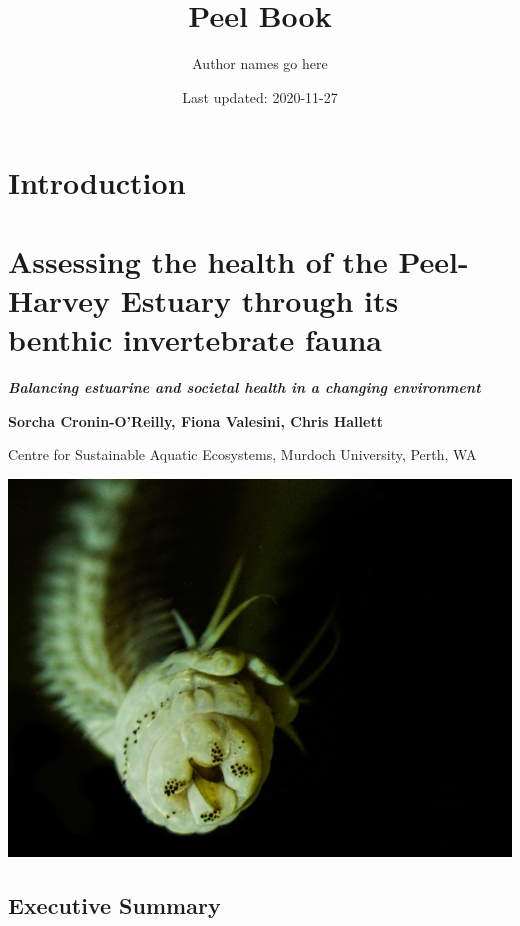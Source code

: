 \documentclass[
]{book}
\title{Peel Book}
\author{Author names go here}
\date{Last updated: 2020-11-27}
\begin{document}
\maketitle

{
\setcounter{tocdepth}{1}
\tableofcontents
}
\hypertarget{introduction}{%
\chapter*{Introduction}\label{introduction}}

\hypertarget{assessing-the-health-of-the-peel-harvey-estuary-through-its-benthic-invertebrate-fauna}{%
\chapter{Assessing the health of the Peel-Harvey Estuary through its benthic invertebrate fauna}\label{assessing-the-health-of-the-peel-harvey-estuary-through-its-benthic-invertebrate-fauna}}

{\textbf{\emph{Balancing estuarine and societal health in a changing environment}}}

{\textbf{Sorcha Cronin-O'Reilly, Fiona Valesini, Chris Hallett}}

{Centre for Sustainable Aquatic Ecosystems, Murdoch University, Perth, WA}

\includegraphics[width=1\linewidth]{images/BMI/picture1}

\hypertarget{executive-summary}{%
\section{Executive Summary}\label{executive-summary}}
\end{document}
